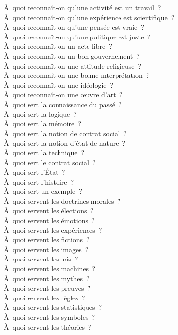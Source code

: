 \documentclass[a4paper,12pt]{article}
\begin{document}
À quoi reconnaît-on qu'une activité est un travail ? \\
À quoi reconnaît-on qu'une expérience est scientifique ? \\
À quoi reconnaît-on qu'une pensée est vraie ? \\
À quoi reconnaît-on qu'une politique est juste ? \\
À quoi reconnaît-on un acte libre ? \\
À quoi reconnaît-on un bon gouvernement ? \\
À quoi reconnaît-on une attitude religieuse ? \\
À quoi reconnaît-on une bonne interprétation ? \\
À quoi reconnaît-on une idéologie ? \\
À quoi reconnaît-on une œuvre d'art ? \\
À quoi sert la connaissance du passé ? \\
À quoi sert la logique ? \\
À quoi sert la mémoire ? \\
À quoi sert la notion de contrat social ? \\
À quoi sert la notion d'état de nature ? \\
À quoi sert la technique ? \\
À quoi sert le contrat social ? \\
À quoi sert l'État ? \\
À quoi sert l'histoire ? \\
À quoi sert un exemple ? \\
À quoi servent les doctrines morales ? \\
À quoi servent les élections ? \\
À quoi servent les émotions ? \\
À quoi servent les expériences ? \\
À quoi servent les fictions ? \\
À quoi servent les images ? \\
À quoi servent les lois ? \\
À quoi servent les machines ? \\
À quoi servent les mythes ? \\
À quoi servent les preuves ? \\
À quoi servent les règles ? \\
À quoi servent les statistiques ? \\
À quoi servent les symboles ? \\
À quoi servent les théories ? \\
\end{document}
